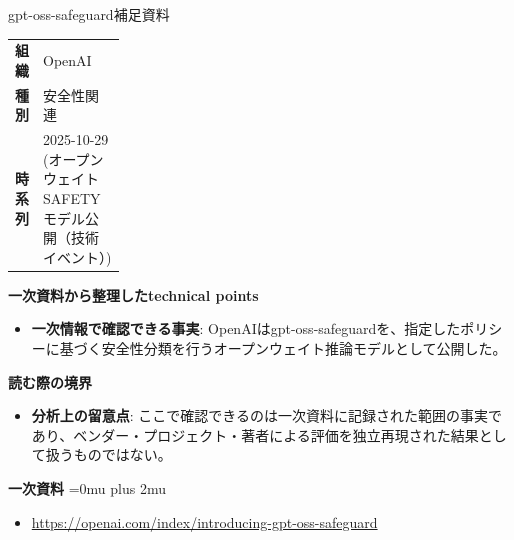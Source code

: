 \begin{technicalnote}{gpt-oss-safeguard}{補足資料}
\begingroup
\begin{tabularx}{\linewidth}{@{}>{\bfseries}p{0.22\linewidth}X@{}}
組織 & OpenAI \\
種別 & 安全性関連 \\
時系列 & 2025-10-29 (オープンウェイト SAFETY モデル公開（技術イベント）) \\
\end{tabularx}
\smallskip
{\bfseries 一次資料から整理したtechnical points}
\begin{itemize}[leftmargin=1.5em,itemsep=0.35em]
\item \textbf{一次情報で確認できる事実}: OpenAIはgpt-oss-safeguardを、指定したポリシーに基づく安全性分類を行うオープンウェイト推論モデルとして公開した。
\end{itemize}
\begin{minipage}{\linewidth}
{\bfseries 読む際の境界}
\begin{itemize}[leftmargin=1.5em,itemsep=0.35em]
\item \textbf{分析上の留意点}: ここで確認できるのは一次資料に記録された範囲の事実であり、ベンダー・プロジェクト・著者による評価を独立再現された結果として扱うものではない。
\end{itemize}
\begin{samepage}
{\bfseries 一次資料}
\begingroup\sloppy
\Urlmuskip=0mu plus 2mu\relax
\begin{itemize}[leftmargin=1.5em,itemsep=0.25em]
\item {\scriptsize\url{https://openai.com/index/introducing-gpt-oss-safeguard}}
\end{itemize}
\endgroup
\end{samepage}
\end{minipage}
\endgroup
\end{technicalnote}
\medskip

